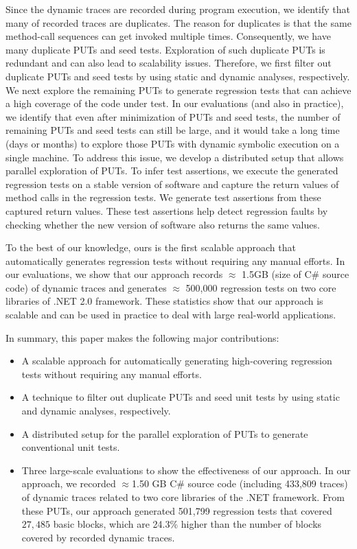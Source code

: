 Since the dynamic traces are recorded during program execution, we identify that many of recorded traces are duplicates. The reason for duplicates is that the same method-call sequences can get invoked multiple times. Consequently, we have many duplicate PUTs and seed tests. Exploration of such duplicate PUTs is redundant and can also lead to scalability issues. Therefore, we first filter out duplicate PUTs and seed tests by using static and dynamic analyses, respectively. We next explore the remaining PUTs to generate regression tests that can achieve a high coverage of the code under test. In our evaluations (and also in practice), we identify that even after minimization of PUTs and seed tests, the number of remaining PUTs and seed tests can still be large, and it would take a long time (days or months) to explore those PUTs with dynamic symbolic execution on a single machine. To address this issue, we develop a distributed setup that allows parallel exploration of PUTs. To infer test assertions, we execute the generated regression tests on a stable version of software and capture the return values of method calls in the regression tests. We generate test assertions from these captured
return values. These test assertions help detect regression faults by checking whether the new version of software also returns the same values.

To the best of our knowledge, ours is the first scalable approach that automatically generates regression tests without requiring any manual efforts. In our evaluations, we show that our approach records $\approx$ 1.5GB (size of C\# source code) of dynamic traces and generates $\approx$ 500,000 regression tests on two core libraries of .NET 2.0 framework. These statistics show that our approach is scalable and can be used in practice to deal with large real-world applications.

In summary, this paper makes the following major contributions:

\begin{itemize}
\item A scalable approach for automatically generating high-covering regression tests without requiring any manual efforts.
\item A technique to filter out duplicate PUTs and seed unit tests by using static and dynamic analyses, respectively.
\item A distributed setup for the parallel exploration of PUTs to generate conventional unit tests.
\item Three large-scale evaluations to show the effectiveness of our approach. In our approach, we recorded $\approx$1.50 GB C\# source code (including 433,809 traces) of dynamic traces related to two core libraries of the .NET framework. From these PUTs, our approach generated 501,799 regression tests that covered $27,485$ basic blocks, which are 24.3\% higher than the number of blocks covered by recorded dynamic traces.
\end{itemize}

